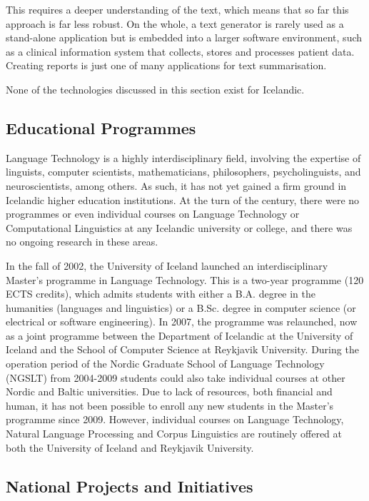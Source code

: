 \begin{multicols}{2}

This requires a deeper understanding of the text, which means that so far this approach is far less robust. On the whole, a text generator is rarely used as a stand-alone application but is embedded into a larger software environment, such as a clinical information system that collects, stores and processes patient data. Creating reports is just one of many applications for text summarisation.

None of the technologies discussed in this section exist for Icelandic.

\subsection{Educational Programmes}

Language Technology is a highly interdisciplinary field, involving the expertise of linguists, computer scientists, mathematicians, philosophers, psycholinguists, and neuroscientists, among others. As such, it has not yet gained a firm ground in Icelandic higher education institutions. At the turn of the century, there were no programmes or even individual courses on Language Technology or Computational Linguistics at any Icelandic university or college, and there was no ongoing research in these areas.

In the fall of 2002, the University of Iceland launched an interdisciplinary Master’s programme in Language Technology. This is a two-year programme (120 ECTS credits), which admits students with either a B.A. degree in the humanities (languages and linguistics) or a B.Sc. degree in computer science (or electrical or software engineering). In 2007, the programme was relaunched, now as a joint programme between the Department of Icelandic at the University of Iceland and the School of Computer Science at Reykjavik University. During the operation period of the Nordic Graduate School of Language Technology (NGSLT) from 2004-2009 students could also take individual courses at other Nordic and Baltic universities. Due to lack of resources, both financial and human, it has not been possible to enroll any new students in the Master’s programme since 2009. However, individual courses on Language Technology, Natural Language Processing and Corpus Linguistics are routinely offered at both the University of Iceland and Reykjavik University.

\subsection{National Projects and Initiatives}


\end{multicols}
